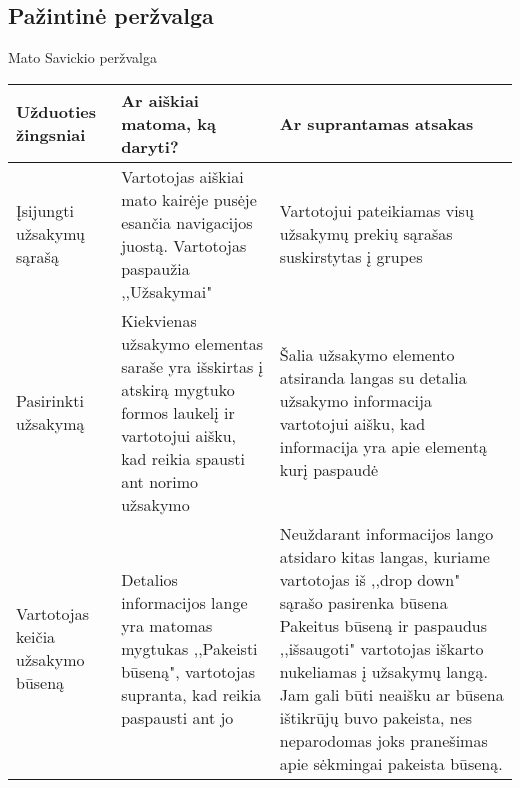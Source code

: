 \documentclass[oneside]{VUMIFPSkursinis}
\begin{document}
	\subsection{Pažintinė peržvalga}
Mato Savickio peržvalga
\begin{center}
    \begin{tabular}{ |p{4cm}| p{6cm} | p{7cm} | }
    \hline
    	Užduoties žingsniai & Ar aiškiai matoma, ką daryti? & Ar suprantamas atsakas \\ \hline 
	Įsijungti užsakymų sąrašą & Vartotojas aiškiai mato kairėje pusėje esančia navigacijos juostą.
					Vartotojas paspaužia ,,Užsakymai" & Vartotojui pateikiamas visų užsakymų prekių sąrašas suskirstytas į grupes \\ \hline
	Pasirinkti užsakymą & Kiekvienas užsakymo elementas saraše yra išskirtas į atskirą mygtuko formos laukelį ir vartotojui aišku, kad reikia spausti ant norimo užsakymo & Šalia užsakymo elemento atsiranda langas su detalia užsakymo informacija vartotojui aišku, kad informacija yra apie elementą kurį paspaudė \\ \hline
	Vartotojas keičia užsakymo būseną & Detalios informacijos lange yra matomas mygtukas ,,Pakeisti būseną", vartotojas supranta, kad reikia paspausti ant jo & Neuždarant informacijos lango atsidaro kitas langas, kuriame vartotojas iš ,,drop down" sąrašo pasirenka būsena  Pakeitus būseną ir paspaudus ,,išsaugoti" vartotojas iškarto nukeliamas į užsakymų langą.
Jam gali būti neaišku ar būsena ištikrūjų buvo pakeista, nes neparodomas joks pranešimas apie sėkmingai pakeista būseną. \\ \hline
	
   \hline
    \end{tabular}
\end{center}
\end{document}
